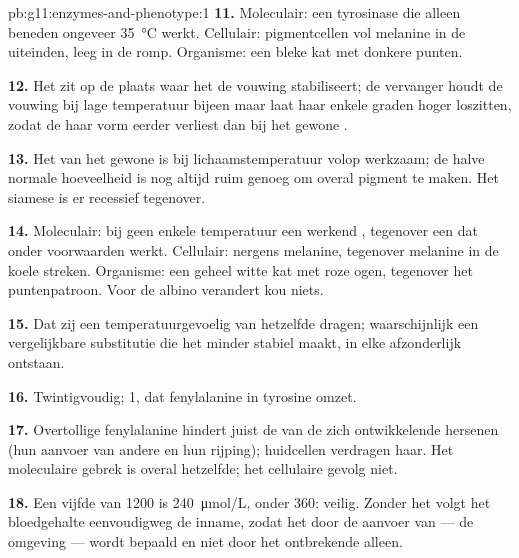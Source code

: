 \begin{solution}{pb:g11:enzymes-and-phenotype:1}
\textbf{11.} Moleculair: een tyrosinase die alleen beneden ongeveer
\qty{35}{\celsius} werkt. Cellulair: pigmentcellen vol melanine in de
uiteinden, leeg in de romp. Organisme: een bleke kat met donkere punten.

\textbf{12.} Het  zit op de plaats waar het de vouwing
stabiliseert; de vervanger houdt de vouwing bij lage temperatuur bijeen
maar laat haar enkele graden hoger loszitten, zodat de  haar
vorm eerder verliest dan bij het gewone .

\textbf{13.} Het  van het gewone  is bij lichaamstemperatuur
volop werkzaam; de halve normale hoeveelheid is nog altijd ruim genoeg om
overal pigment te maken. Het siamese  is er recessief tegenover.

\textbf{14.} Moleculair: bij geen enkele temperatuur een werkend ,
tegenover een  dat onder voorwaarden werkt. Cellulair: nergens
melanine, tegenover melanine in de koele streken. Organisme: een geheel
witte kat met roze ogen, tegenover het puntenpatroon. Voor de albino
verandert kou niets.

\textbf{15.} Dat zij een temperatuurgevoelig  van hetzelfde 
dragen; waarschijnlijk een vergelijkbare substitutie die het 
minder stabiel maakt, in elke  afzonderlijk ontstaan.

\textbf{16.} Twintigvoudig;  1, dat fenylalanine in tyrosine omzet.

\textbf{17.} Overtollige fenylalanine hindert juist de  van de zich
ontwikkelende hersenen (hun aanvoer van andere  en hun
rijping); huidcellen verdragen haar. Het moleculaire gebrek is overal
hetzelfde; het cellulaire gevolg niet.

\textbf{18.} Een vijfde van \num{1200} is \qty{240}{\micro mol/L}, onder
\num{360}: veilig. Zonder het  volgt het bloedgehalte eenvoudigweg
de inname, zodat het  door de aanvoer van  --- de
omgeving --- wordt bepaald en niet door het ontbrekende  alleen.


\end{solution}
